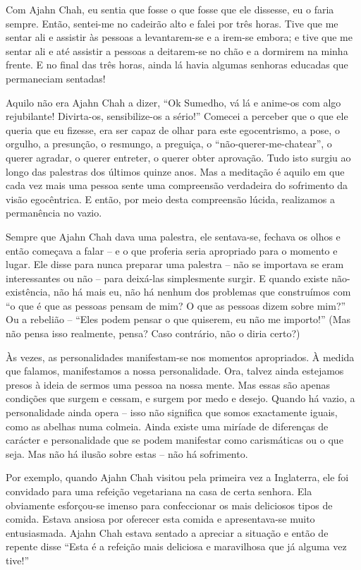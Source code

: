Com Ajahn Chah, eu sentia que fosse o que fosse que ele dissesse, eu o faria
sempre. Então, sentei-me no cadeirão alto e falei por três horas. Tive que me
sentar ali e assistir às pessoas a levantarem-se e a irem-se embora; e tive que
me sentar ali e até assistir a pessoas a deitarem-se no chão e a dormirem na
minha frente. E no final das três horas, ainda lá havia algumas senhoras
educadas que permaneciam sentadas!

Aquilo não era Ajahn Chah a dizer, ``Ok Sumedho, vá lá e anime-os com algo
rejubilante! Divirta-os, sensibilize-os a sério!'' Comecei a perceber que o que
ele queria que eu fizesse, era ser capaz de olhar para este egocentrismo, a
pose, o orgulho, a presunção, o resmungo, a preguiça, o
``não-querer-me-chatear'', o querer agradar, o querer entreter, o querer obter
aprovação. Tudo isto surgiu ao longo das palestras dos últimos quinze anos. Mas
a meditação é aquilo em que cada vez mais uma pessoa sente uma compreensão
verdadeira do sofrimento da visão egocêntrica. E então, por meio desta
compreensão lúcida, realizamos a permanência no vazio.

Sempre que Ajahn Chah dava uma palestra, ele sentava-se, fechava os olhos e
então começava a falar -- e o que proferia seria apropriado para o momento e
lugar. Ele disse para nunca preparar uma palestra -- não se importava se eram
interessantes ou não -- para deixá-las simplesmente surgir. E quando existe
não-existência, não há mais eu, não há nenhum dos problemas que construímos com
``o que é que as pessoas pensam de mim? O que as pessoas dizem sobre mim?'' Ou a
rebelião -- ``Eles podem pensar o que quiserem, eu não me importo!'' (Mas não
pensa isso realmente, pensa? Caso contrário, não o diria certo?)

Às vezes, as personalidades manifestam-se nos momentos apropriados. À medida que
falamos, manifestamos a nossa personalidade. Ora, talvez ainda estejamos presos
à ideia de sermos uma pessoa na nossa mente. Mas essas são apenas condições que
surgem e cessam, e surgem por medo e desejo. Quando há vazio, a personalidade
ainda opera -- isso não significa que somos exactamente iguais, como as abelhas
numa colmeia. Ainda existe uma miríade de diferenças de carácter e personalidade
que se podem manifestar como carismáticas ou o que seja. Mas não há ilusão sobre
estas -- não há sofrimento.

Por exemplo, quando Ajahn Chah visitou pela primeira vez a Inglaterra, ele foi
convidado para uma refeição vegetariana na casa de certa senhora. Ela obviamente
esforçou-se imenso para confeccionar os mais deliciosos tipos de comida. Estava
ansiosa por oferecer esta comida e apresentava-se muito entusiasmada. Ajahn Chah
estava sentado a apreciar a situação e então de repente disse ``Esta é a
refeição mais deliciosa e maravilhosa que já alguma vez tive!''

